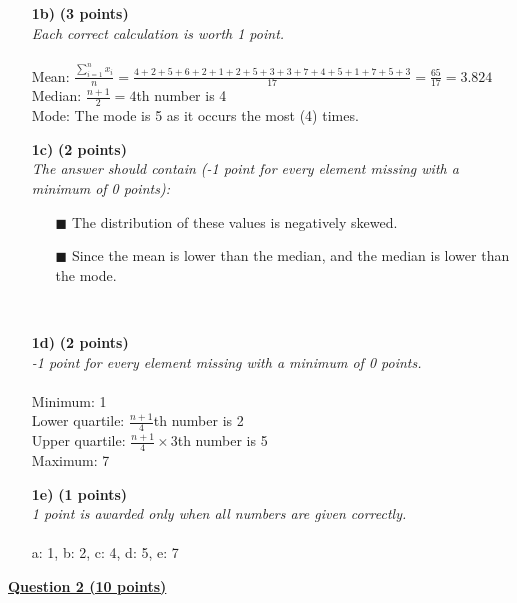 \begin{itemize}
     \item[\textbf{1b)}] \textbf{(3 points)} \\
     \textit{Each correct calculation is worth 1 point.}   \\
     \\
     Mean: $\frac{\sum_{i = 1}^n x_i}{n} = \frac{4 + 2 + 5 + 6 + 2 + 1 + 2 + 5 + 3 + 3 + 7 + 4 + 5 + 1 + 7 + 5 + 3}{17} = \frac{65}{17} = 3.824$\\
     Median: $\frac{n + 1}{2} = 4$th number is 4\\
     Mode: The mode is 5 as it occurs the most (4) times. \\
     \item[\textbf{1c)}] \textbf{(2 points)} \\
     \textit{The answer should contain (-1 point for every element missing with a minimum of 0 points):}
    \begin{itemize}
    \item[$\blacksquare$] The distribution of these values is negatively skewed.        
    \item[$\blacksquare$] Since the mean is lower than the median, and the median is 
lower than the mode.
    \end{itemize} \\
     \item[\textbf{1d)}] \textbf{(2 points)} \\
     \textit{-1 point for every element missing with a minimum of 0 points.}\\
     \\
     Minimum: 1 \\
     Lower quartile: $\frac{n + 1}{4}$th number is 2\\
     Upper quartile: $\frac{n + 1}{4} \times 3$th number is 5\\
     Maximum: 7 \\
\item[\textbf{1e)}] \textbf{(1 points)} \\
     \textit{1 point is awarded only when all numbers are given correctly.} \\ \\
     a: 1, b: 2, c: 4, d: 5, e: 7 \\
\end{itemize}

\underline{\textbf{Question 2 (10 points)}} \\

